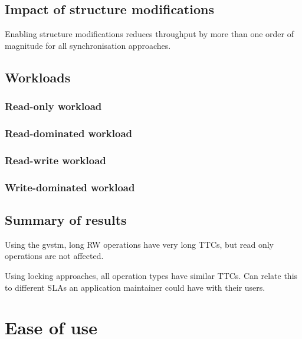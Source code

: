 \documentclass[12pt,a4paper,oneside,openright]{report}
\begin{document}
\subsection{Impact of structure modifications}
\label{sec:impl:impact-struct-modif}

Enabling structure modifications reduces throughput by more than one
order of magnitude for all synchronisation approaches.

\subsection{Workloads}
\label{sec:impl:workloads}

\subsubsection{Read-only workload}
\label{sec:impl:read-only-workload}

\subsubsection{Read-dominated workload}
\label{sec:eval:read-domin-workl}

\subsubsection{Read-write workload}
\label{sec:impl:read-write-workload}

\subsubsection{Write-dominated workload}
\label{sec:eval:write-domin-workl}


\subsection{Summary of results}
\label{sec:eval:summary-results}

Using the gvstm, long RW operations have very long TTCs, but read only
operations are not affected.

Using locking approaches, all operation types have similar TTCs. Can
relate this to different SLAs an application maintainer could have
with their users.

\section{Ease of use}
\label{sec:eval:ease-use}
\end{document}
